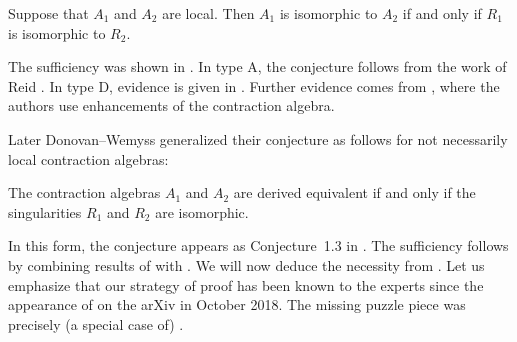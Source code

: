 \documentclass[a4paper]{amsart}
\begin{document}
\begin{conjecture}[\cite{DW16}]
Suppose that $A_1$ and $A_2$ are local.  Then $A_1$ is isomorphic to $A_2$ if and only if 
$R_1$ is isomorphic to $R_2$.
\end{conjecture}
The sufficiency was shown in \cite{DW16}. In type A, the conjecture follows
from the work of Reid \cite{Reid81}. In type D, evidence is given in
\cite{BrownWemyss18, vanGarderen20, Kawamata20}. Further evidence
comes from \cite{Hua18, HuaToda18, HK23+, Booth21}, where the authors
use enhancements of the contraction algebra.

Later Donovan--Wemyss generalized
their conjecture as follows for not necessarily local contraction algebras:
\begin{conjecture} The contraction algebras $A_1$ and $A_2$ are derived
equivalent if and only if the singularities $R_1$ and $R_2$ are
isomorphic. 
\end{conjecture}
In this form, the conjecture appears as Conjecture~1.3 in \cite{Aug20a}.
The  sufficiency follows by combining results of \cite{Wem18} with \cite{Dugas15}.
We will now deduce the necessity from  .
Let us emphasize that our strategy of proof has been known to the experts
since the appearance of \cite{HK23+} on the arXiv in October 2018. The 
missing puzzle piece was precisely (a special case of)
.
\end{document}

